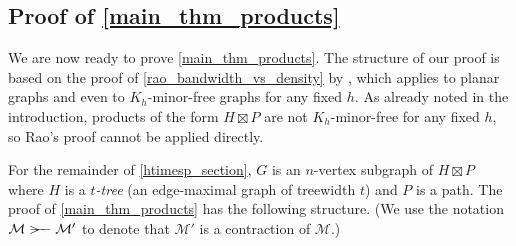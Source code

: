\documentclass{patmorin}
\renewcommand{\ge}{\geqslant}
\newcommand{\defin}[1]{\emph{\textcolor{brightmaroon}{#1}}}
\DeclareMathOperator{\diam}{diam}
\begin{document}
%
%
%

\subsection{Proof of \cref{main_thm_products}}


We are now ready to prove \cref{main_thm_products}. The structure of our proof is based on the proof of \cref{rao_bandwidth_vs_density} by \citet{rao:small}, which applies to planar graphs and even to $K_{h}$-minor-free graphs for any fixed $h$.  As already noted in the introduction, products of the form $H\boxtimes P$ are not $K_h$-minor-free for any fixed $h$, so Rao's proof cannot be applied directly.


For the remainder of \cref{htimesp_section}, $G$ is an $n$-vertex subgraph of $H\boxtimes P$ where $H$ is a \defin{$t$-tree} (an edge-maximal graph of treewidth $t$) and $P$ is a path.  The proof of \cref{main_thm_products} has the following structure. (We use the notation $\mathcal{M}\rightbroom\mathcal{M'}$ to denote that $\mathcal{M}'$ is a contraction of $\mathcal{M}$.)
\end{document}
